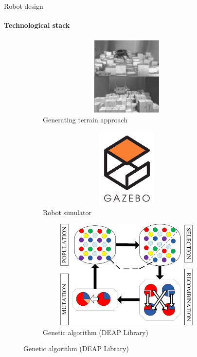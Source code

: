 \documentclass[aspectratio=169]{beamer}
\begin{document}
\begin{frame}[c]{Robot design}
    \framesubtitle{Technological stack}
    \vspace{-1.2cm}
    \begin{figure}[H]
        \begin{subfigure}{0.32\textwidth}
            \centering\includegraphics[height=4cm,width=1\textwidth,keepaspectratio]{c1_paper.png}
            \caption*{Generating terrain approach}
        \end{subfigure}
        \hfill
        \begin{subfigure}{0.32\textwidth}
            \centering\includegraphics[height=4cm,width=1\textwidth,keepaspectratio]{gazebo_logo.png}
            \caption*{Robot simulator}
        \end{subfigure}
        \hfill
        \begin{subfigure}{0.32\textwidth}
            \centering\includegraphics[height=5.5cm,width=1\textwidth,keepaspectratio]{gen_algo.jpg}
            \caption*{Genetic algorithm (DEAP Library)}
        \end{subfigure}
        \hfill
    \end{figure}
\end{frame}
\end{document}
